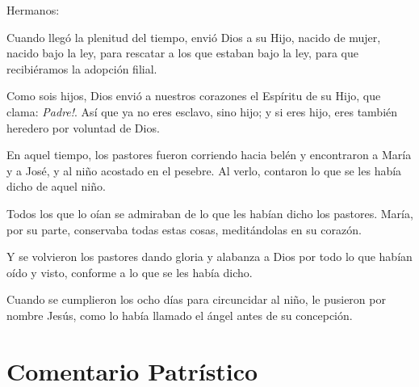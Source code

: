 
\begin{scripture}
	Hermanos:
	
	Cuando llegó la plenitud del tiempo, envió Dios a su Hijo, nacido de mujer, nacido bajo la ley, para rescatar a los que estaban bajo la ley, para que recibiéramos la adopción filial.
	
	Como sois hijos, Dios envió a nuestros corazones el Espíritu de su Hijo, que clama: \emph{ Padre!}. Así que ya no eres esclavo, sino hijo; y si eres hijo, eres también heredero por voluntad de Dios.
\end{scripture}


 


\begin{scripture}
	En aquel tiempo, los pastores fueron corriendo hacia belén y encontraron a María y a José, y al niño acostado en el pesebre. Al verlo, contaron lo que se les había dicho de aquel niño.
	
	Todos los que lo oían se admiraban de lo que les habían dicho los pastores. María, por su parte, conservaba todas estas cosas, meditándolas en su corazón.
	
	Y se volvieron los pastores dando gloria y alabanza a Dios por todo lo que habían oído y visto, conforme a lo que se les había dicho.
	
	Cuando se cumplieron los ocho días para circuncidar al niño, le pusieron por nombre Jesús, como lo había llamado el ángel antes de su concepción.
\end{scripture}

\newsection

\section{Comentario Patrístico}





\newsection






\newsection


